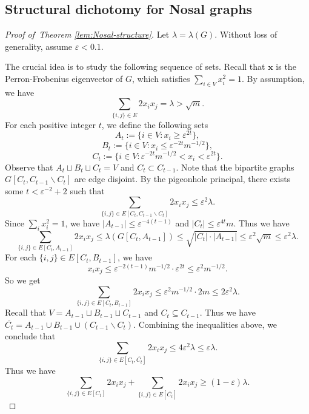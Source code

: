 \documentclass[11pt,a4paper]{article}
\theoremstyle{definition}
\theoremstyle{remark}
\newcommand*{\abs}[1]{\lvert#1\rvert}
\begin{document}
\subsection{Structural dichotomy for Nosal graphs}

\begin{proof}[Proof of~Theorem \ref{lem:Nosal-structure}]
    Let $\lambda = \lambda(G)$. Without loss of generality, assume $\varepsilon < 0.1$. 
    
    The crucial idea is to study the following sequence of sets. 
    Recall that $\bm{x}$ is the Perron-Frobenius eigenvector of $G$, which satisfies 
    $\sum_{i\in V} x_i^2 =1$.  By assumption, we have
    $$\sum_{\{i,j\} \in E} 2x_i x_j = \lambda > \sqrt{m}.$$
    For each positive integer $t$, we define the following sets
    $$A_t := \{i\in V: x_i \geq \varepsilon^{2t}\},$$
    $$B_t := \{i\in V: x_i \leq \varepsilon^{-2t} m^{-1/2}\},$$
    $$C_t := \{i\in V: \varepsilon^{-2t} m^{-1/2} < x_i < \varepsilon^{2t}\}.$$
    Observe that $A_t \sqcup B_t \sqcup C_t = V$ and $C_t \subset C_{t-1}$. Note that the bipartite graphs $G[C_t, C_{t - 1} \backslash C_t]$ are edge disjoint. By the pigeonhole principal, there exists some $t < \varepsilon^{-2} + 2$ such that
    $$\sum_{\{i,j\} \in E[C_t, C_{t - 1} \backslash C_t]} 
    2 x_ix_j \leq \varepsilon^2 \lambda.$$
    Since $\sum_i x_i^2 =1$, we have $\abs{A_{t - 1}} \leq \varepsilon^{-4(t - 1)}$ and $|C_t| \le \varepsilon^{4t}m$. 
    Thus we have
    $$\sum_{\{i,j\} \in E[C_t, A_{t - 1}]} 2x_i x_j\le \lambda (G[C_t, A_{t-1}])\le \sqrt{|C_t|\cdot |A_{t-1}|} \le \varepsilon^{2}\sqrt{m} 
    \le \varepsilon^{2}\lambda.$$
    For each $\{i,j\} \in E[C_t, B_{t - 1}]$, we have
    $$x_i x_j \leq \varepsilon^{-2(t - 1)}m^{-1/2} \cdot \varepsilon^{2t} \leq \varepsilon^2 m^{-1/2}.$$
    So we get
    $$\sum_{\{i,j\} \in E[C_t, B_{t - 1}]} 2x_i x_j \leq  \varepsilon^2 m^{-1/2} \cdot 2m \leq 2\varepsilon^2 \lambda.$$ 
    Recall that $V=A_{t-1} \sqcup B_{t-1} \sqcup C_{t-1}$ and $C_t \subseteq C_{t-1}$. 
    Thus we have $\overline{C_t} = A_{t - 1} \cup B_{t - 1} \cup (C_{t - 1} \backslash C_t)$. Combining the inequalities above, we conclude that 
    $$\sum_{\{i,j\} \in E[C_t, \overline{C_t}]} 2x_i x_j\leq 4 \varepsilon^2 \lambda \leq \varepsilon \lambda.$$
    Thus we have
    \begin{equation}
    \label{eq:Nosal-structure-intermediate}
    \sum_{\{i,j\} \in E[C_t]} 2x_i x_j 
    + \sum_{\{i,j\} \in E[\overline{C_t}]}2 x_i x_j \geq (1 - \varepsilon) \lambda.
    \end{equation}

\end{proof}
\end{document}

